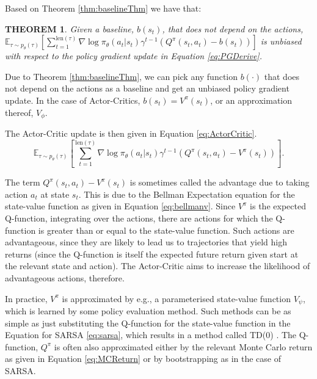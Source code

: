 \documentclass{report}
\newtheorem{theorem}{THEOREM}
\numberwithin{equation}{section}
\numberwithin{figure}{section}
\numberwithin{table}{section}
\numberwithin{algorithm}{section}
\begin{document}
Based on Theorem \ref{thm:baselineThm} we have that:
\begin{theorem}\label{thm:unbiasedBaseline}
  Given a baseline, $b(s_t)$, that does not depend on the actions,\\
  $\mathbb{E}_{\tau\sim p_\theta(\tau)}\left[\sum_{t=1}^{\text{len}(\tau)}\nabla \log \pi_\theta(a_t|s_t)
  \gamma^{t-1}\left(Q^{\pi}(s_t, a_t)-b(s_t)\right)\right]$ is unbiased with respect 
  to the policy gradient update in Equation \ref{eq:PGDerive}.
\end{theorem}
Due to Theorem \ref{thm:baselineThm}, we can pick any function 
$b(\cdot)$ that does not depend on the actions as a baseline and 
get an unbiased policy gradient update. In the case of Actor-Critics, 
$b(s_t)=V^{\pi}(s_t)$, or an approximation thereof, $V_{\phi}$.

The Actor-Critic update is then given in Equation \ref{eq:ActorCritic}.
\begin{equation}\label{eq:ActorCritic}
  \mathbb{E}_{\tau\sim p_\theta(\tau)}\left[\sum_{t=1}^{\text{len}(\tau)}\nabla \log \pi_\theta(a_t|s_t)
  \gamma^{t-1}\left(Q^{\pi}(s_t, a_t)-V^{\pi}(s_t)\right)\right].
\end{equation}

The term $Q^{\pi}(s_t,a_t)-V^{\pi}(s_t)$ is sometimes called the 
advantage due to taking action $a_t$ at state $s_t$. This is 
due to the Bellman Expectation equation for the state-value function 
as given in Equation \ref{eq:bellmanv}. Since $V^{\pi}$ is the 
expected Q-function, integrating over the actions, there are 
actions for which the Q-function is greater than or equal to the 
state-value function. Such actions are advantageous, since they are 
likely to lead us to trajectories that yield high returns (since the 
Q-function is itself the expected future return given start at 
the relevant state and action). The Actor-Critic aims to 
increase the likelihood of advantageous actions, therefore.

In practice, $V^{\pi}$ is approximated by e.g., a parameterised 
state-value function $V_\psi$, which is learned by some policy 
evaluation method. Such methods can be as simple as just 
substituting the Q-function for the state-value function 
in the Equation for SARSA \ref{eq:sarsa}, which results in 
a method called TD(0) \citep{SuttonTD}. 
The Q-function, $Q^{\pi}$ is often also approximated 
either by the relevant Monte Carlo return as given in Equation 
\ref{eq:MCReturn} or by bootstrapping as in the 
case of SARSA.
\end{document}
